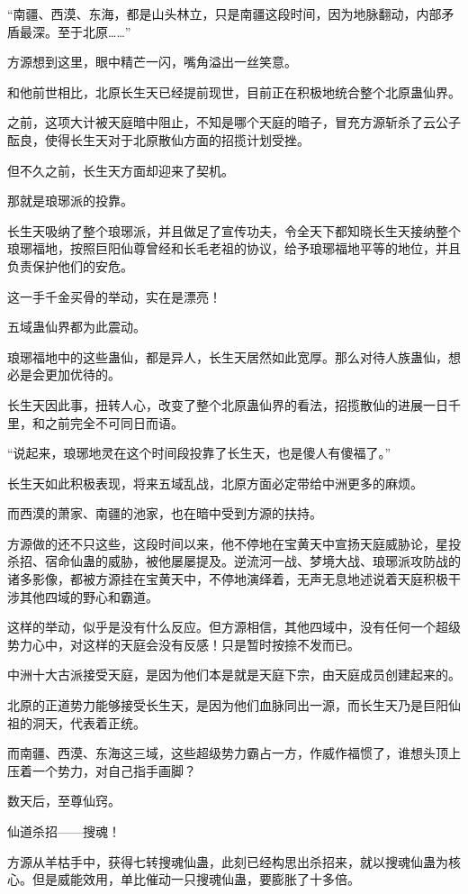 \begin{this_body}
“南疆、西漠、东海，都是山头林立，只是南疆这段时间，因为地脉翻动，内部矛盾最深。至于北原……”

方源想到这里，眼中精芒一闪，嘴角溢出一丝笑意。

和他前世相比，北原长生天已经提前现世，目前正在积极地统合整个北原蛊仙界。

之前，这项大计被天庭暗中阻止，不知是哪个天庭的暗子，冒充方源斩杀了云公子酝良，使得长生天对于北原散仙方面的招揽计划受挫。

但不久之前，长生天方面却迎来了契机。

那就是琅琊派的投靠。

长生天吸纳了整个琅琊派，并且做足了宣传功夫，令全天下都知晓长生天接纳整个琅琊福地，按照巨阳仙尊曾经和长毛老祖的协议，给予琅琊福地平等的地位，并且负责保护他们的安危。

这一手千金买骨的举动，实在是漂亮！

五域蛊仙界都为此震动。

琅琊福地中的这些蛊仙，都是异人，长生天居然如此宽厚。那么对待人族蛊仙，想必是会更加优待的。

长生天因此事，扭转人心，改变了整个北原蛊仙界的看法，招揽散仙的进展一日千里，和之前完全不可同日而语。

“说起来，琅琊地灵在这个时间段投靠了长生天，也是傻人有傻福了。”

长生天如此积极表现，将来五域乱战，北原方面必定带给中洲更多的麻烦。

而西漠的萧家、南疆的池家，也在暗中受到方源的扶持。

方源做的还不只这些，这段时间以来，他不停地在宝黄天中宣扬天庭威胁论，星投杀招、宿命仙蛊的威胁，被他屡屡提及。逆流河一战、梦境大战、琅琊派攻防战的诸多影像，都被方源挂在宝黄天中，不停地演绎着，无声无息地述说着天庭积极干涉其他四域的野心和霸道。

这样的举动，似乎是没有什么反应。但方源相信，其他四域中，没有任何一个超级势力心中，对这样的天庭会没有反感！只是暂时按捺不发而已。

中洲十大古派接受天庭，是因为他们本是就是天庭下宗，由天庭成员创建起来的。

北原的正道势力能够接受长生天，是因为他们血脉同出一源，而长生天乃是巨阳仙祖的洞天，代表着正统。

而南疆、西漠、东海这三域，这些超级势力霸占一方，作威作福惯了，谁想头顶上压着一个势力，对自己指手画脚？

数天后，至尊仙窍。

仙道杀招——搜魂！

方源从羊枯手中，获得七转搜魂仙蛊，此刻已经构思出杀招来，就以搜魂仙蛊为核心。但是威能效用，单比催动一只搜魂仙蛊，要膨胀了十多倍。


\end{this_body}
